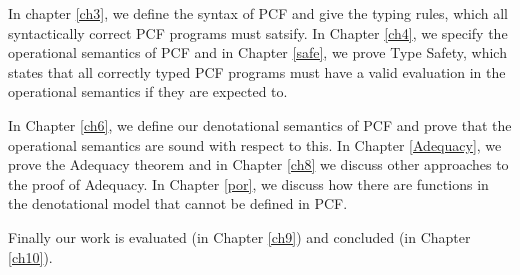 In chapter \ref{ch3}, we define the syntax of PCF and give the typing rules, which all syntactically correct PCF programs must satsify. In Chapter \ref{ch4}, we specify the operational semantics of PCF and in Chapter \ref{safe}, we prove Type Safety, which states that all correctly typed PCF programs must have a valid evaluation in the operational semantics if they are expected to.

In Chapter \ref{ch6}, we define our denotational semantics of PCF and prove that the operational semantics are sound with respect to this. In Chapter \ref{Adequacy}, we prove the Adequacy theorem and in Chapter \ref{ch8} we discuss other approaches to the proof of Adequacy. In Chapter \ref{por}, we discuss how there are functions in the denotational model that cannot be defined in PCF.

Finally our work is evaluated (in Chapter \ref{ch9}) and concluded (in Chapter \ref{ch10}).
